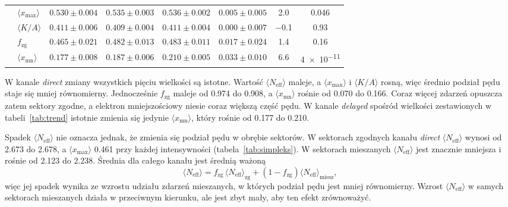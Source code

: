 \documentclass[12pt,a4paper]{article}
\newcommand{\Neff}{N_{\mathrm{eff}}}
\newcommand{\xmax}{x_{\max}}
\begin{document}
\begin{table}[htbp]
{\begin{tabular}{llcccccc}
                   & $\langle\xmax\rangle$           & $\num{0.530}\pm\num{0.004}$ & $\num{0.535}\pm\num{0.003}$ & $\num{0.536}\pm\num{0.002}$ & $\num{0.005}\pm\num{0.005}$ & \num{2.0} & \num{0.046} \\
                   & $\langle K/A\rangle$            & $\num{0.411}\pm\num{0.006}$ & $\num{0.409}\pm\num{0.004}$ & $\num{0.411}\pm\num{0.004}$ & $\num{0.000}\pm\num{0.007}$ & \num{-0.1} & \num{0.93} \\
                   & $f_{\mathrm{zg}}$               & $\num{0.465}\pm\num{0.021}$ & $\num{0.482}\pm\num{0.013}$ & $\num{0.483}\pm\num{0.011}$ & $\num{0.017}\pm\num{0.024}$ & \num{1.4} & \num{0.16} \\
                   & $\langle x_{\mathrm{mn}}\rangle$ & $\num{0.177}\pm\num{0.008}$ & $\num{0.187}\pm\num{0.006}$ & $\num{0.210}\pm\num{0.005}$ & $\num{0.033}\pm\num{0.010}$ & \num{6.6} & \num{4e-11} \\
    \bottomrule
  \end{tabular}}
\end{table}

W kanale \emph{direct} zmiany wszystkich pięciu wielkości są istotne.
Wartość $\langle\Neff\rangle$ maleje, a $\langle\xmax\rangle$
i $\langle K/A\rangle$ rosną, więc średnio podział pędu staje się mniej
równomierny. Jednocześnie $f_{\mathrm{zg}}$ maleje od \num{0.974} do
\num{0.908}, a $\langle x_{\mathrm{mn}}\rangle$ rośnie od \num{0.070} do
\num{0.166}. Coraz więcej zdarzeń opuszcza zatem sektory zgodne,
a elektron mniejszościowy niesie coraz większą część pędu.
W kanale \emph{delayed} spośród wielkości zestawionych
w tabeli~\ref{tab:trend} istotnie zmienia się jedynie
$\langle x_{\mathrm{mn}}\rangle$, który rośnie od \num{0.177} do
\num{0.210}.

Spadek $\langle\Neff\rangle$ nie oznacza jednak, że zmienia się podział
pędu w obrębie sektorów. W sektorach zgodnych kanału \emph{direct}
$\langle\Neff\rangle$ wynosi od \num{2.673} do \num{2.678},
a $\langle\xmax\rangle$ \num{0.461} przy każdej intensywności
(tabela~\ref{tab:simpleks}). W sektorach mieszanych $\langle\Neff\rangle$
jest znacznie mniejsza i rośnie od \num{2.123} do \num{2.238}. Średnia
dla całego kanału jest średnią ważoną
\begin{equation}
  \langle\Neff\rangle=f_{\mathrm{zg}}\,\langle\Neff\rangle_{\mathrm{zg}}
  +\left(1-f_{\mathrm{zg}}\right)\langle\Neff\rangle_{\mathrm{miesz}},
  \label{eq:sklad}
\end{equation}
więc jej spadek wynika ze wzrostu udziału zdarzeń mieszanych, w których
podział pędu jest mniej równomierny. Wzrost $\langle\Neff\rangle$
w samych sektorach mieszanych działa w przeciwnym kierunku, ale jest
zbyt mały, aby ten efekt zrównoważyć.
\end{document}
